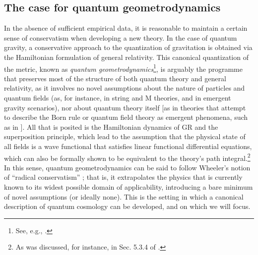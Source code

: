\documentclass[12pt]{iopart}
\begin{document}
\subsection{The case for quantum geometrodynamics}
In the absence of sufficient empirical data, it is reasonable to maintain a certain sense of conservatism when developing a new theory. In the case of quantum gravity, a conservative approach to the quantization of gravitation is obtained via the Hamiltonian formulation of general relativity. This canonical quantization of the metric, known as {\em quantum geometrodynamics}\footnote{See, e.g., \citet{Kiefer:book,Kiefer:2008bs}.}, is arguably the programme that preserves most of the structure of both quantum theory and general relativity, as it involves no novel assumptions about the nature of particles and quantum fields (as, for instance, in string and M theories, and in emergent gravity scenarios), nor about quantum theory itself [as in theories that attempt to describe the Born rule or quantum field theory as emergent phenomena, such as in \citet{Adler:book}]. All that is posited is the Hamiltonian dynamics of GR and the superposition principle, which lead to the assumption that the physical state of all fields is a wave functional that satisfies linear functional differential equations, which can also be formally shown to be equivalent to the theory's path integral.\footnote{As was discussed, for instance, in Sec. 5.3.4 of \citet{Kiefer:book}.} In this sense, quantum geometrodynamics can be said to follow Wheeler's notion of ``radical conservatism'' \citep{Thorne:2019scz}; that is, it extrapolates the physics that is currently known to its widest possible domain of applicability, introducing a bare minimum of novel assumptions (or ideally none). This is the setting in which a canonical description of quantum cosmology can be developed, and on which we will focus.
\end{document}
